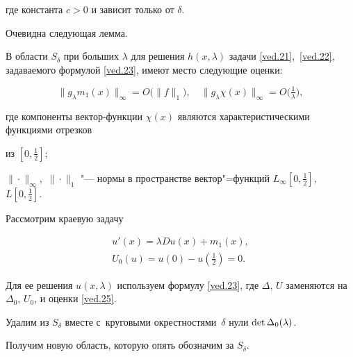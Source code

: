 где константа $c>0$ и зависит только от $\delta$.

  

\smallskip  



Очевидна следующая лемма.

\smallskip  

  

 \begin{lemma}[3]В области $S_{\delta}$ при больших $\lambda$ для решения $h(x,\lambda)$ задачи \eqref{ved.21}$,$ \eqref{ved.22}, задаваемого формулой \eqref{ved.23}, имеют место следующие оценки{\rm\/:}

\begin{equation}

\label{ved.26}

\|g_{\lambda}m_1(x)\|_{\infty}=O\bigl(\|f\|_1\bigr), \quad 

\|g_{\lambda}\chi(x)\|_{\infty}=O\bigl(\tfrac{1}{\lambda}\bigr),

\end{equation}

где компоненты вектор-функции $\chi(x)$ являются характеристическими функциями отрезков 

из $[0,\frac12];$ 

$\|{}\cdot{}\|_{\infty},$ $\|{}\cdot{}\|_1$ "--- нормы в пространстве вектор"=функций $L_{\infty}[0,\frac{1}{2}],$ $L[0,\tfrac{1}{2}].$

\end{lemma}



\smallskip



Рассмотрим краевую задачу

\begin{gather}

u'(x)=\lambda Du(x)+m_1(x),

\\

U_{0}(u)=u(0)-u(\tfrac{1}{2})=0.

\end{gather}



Для ее решения $u(x,\lambda)$ используем формулу \eqref{ved.23}, где $\Delta$, $U$ заменяются на $\Delta_{0}$, $U_{0}$, и оценки \eqref{ved.25}. 

Удалим из $S_{\delta}$ вместе с~круговыми окрестностями~$\delta$ нули $\mathop{\rm det}\Delta_{0}(\lambda)$. 

Получим новую область, которую опять обозначим за $S_{\delta}$. 

